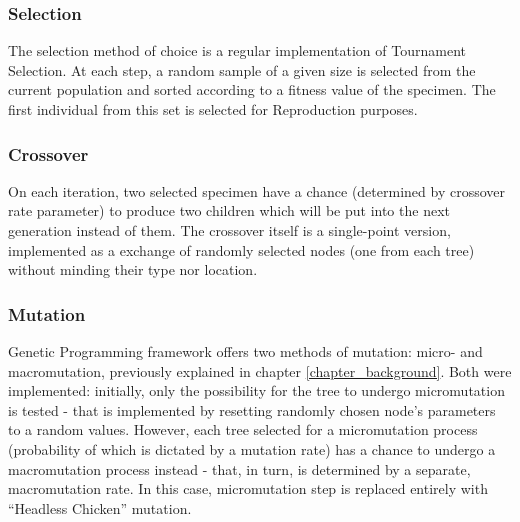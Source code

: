 \subsubsection{Selection}
The selection method of choice is a regular implementation of Tournament Selection. At each step, a random sample of a given size is selected from the current population and sorted according to a fitness value of the specimen. The first individual from this set is selected for Reproduction purposes.
\subsubsection{Crossover}
On each iteration, two selected specimen have a chance (determined by crossover rate parameter) to produce two children which will be put into the next generation instead of them. The crossover itself is a single-point version, implemented as a exchange of randomly selected nodes (one from each tree) without minding their type nor location.
\subsubsection{Mutation}
Genetic Programming framework offers two methods of mutation: micro- and macromutation, previously explained in chapter \ref{chapter_background}. Both were implemented: initially, only the possibility for the tree to undergo micromutation is tested - that is implemented by resetting randomly chosen node's parameters to a random values. However, each tree selected for a micromutation process (probability of which is dictated by a mutation rate) has a chance to undergo a macromutation process instead - that, in turn, is determined by a separate, macromutation rate. In this case, micromutation step is replaced entirely with ``Headless Chicken'' mutation.
